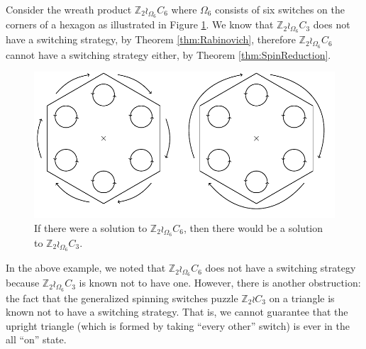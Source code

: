 \begin{example}
  Consider the wreath product $\mathbb Z_2 \wr_{\Omega_6} C_6$ where
  $\Omega_6$ consists of six switches on the corners of a hexagon as
  illustrated in Figure \ref{fig:Z2C6}.
  We know that $\mathbb Z_2 \wr_{\Omega_6} C_3$ does not have a switching
  strategy, by Theorem \ref{thm:Rabinovich}, therefore
  $\mathbb Z_2 \wr_{\Omega_6} C_6$ cannot have a switching strategy either, by
  Theorem \ref{thm:SpinReduction}.
\end{example}

\begin{figure}
  \center
  \includegraphics{assets/tikz_Z2C6.pdf}
  \caption[A reduction from $60^\circ$ rotations to $120^\circ$ rotations.]{
    If there were a solution to $\mathbb Z_2 \wr_{\Omega_6} C_6$,
  then there would be a solution to $\mathbb Z_2 \wr_{\Omega_6} C_3$.
  }
\label{fig:Z2C6}
\end{figure}

In the above example, we noted that $\mathbb Z_2 \wr_{\Omega_6} C_6$ does
not have a switching strategy because ${\mathbb Z_2 \wr_{\Omega_6} C_3}$ is
known not to have one. However, there is another obstruction: the fact that
the generalized spinning switches puzzle $\mathbb Z_2 \wr C_3$ on a triangle
is known not to have a switching strategy. That is, we cannot guarantee that
the upright triangle (which is formed by taking ``every other'' switch)
is ever in the all ``on'' state.

